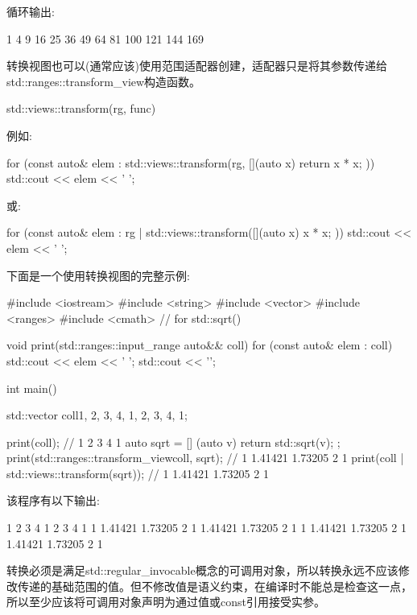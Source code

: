 循环输出:

\begin{shell}
1 4 9 16 25 36 49 64 81 100 121 144 169
\end{shell}


转换视图也可以(通常应该)使用范围适配器创建，适配器只是将其参数传递给std::ranges::transform\_view构造函数。

\begin{cpp}
std::views::transform(rg, func)
\end{cpp}

例如:

\begin{cpp}
for (const auto& elem : std::views::transform(rg, [](auto x) {
						return x * x;
					})) {
	std::cout << elem << ' ';
}
\end{cpp}

或:

\begin{cpp}
for (const auto& elem : rg | std::views::transform([](auto x) {
						x * x;
					})) {
	std::cout << elem << ' ';
}
\end{cpp}

下面是一个使用转换视图的完整示例:


\begin{cpp}
#include <iostream>
#include <string>
#include <vector>
#include <ranges>
#include <cmath> // for std::sqrt()

void print(std::ranges::input_range auto&& coll)
{
	for (const auto& elem : coll) {
		std::cout << elem << ' ';
	}
	std::cout << '\n';
}

int main()
{
	std::vector coll{1, 2, 3, 4, 1, 2, 3, 4, 1};
	
	print(coll); // 1 2 3 4 1
	auto sqrt = [] (auto v) { return std::sqrt(v); };
	print(std::ranges::transform_view{coll, sqrt}); // 1 1.41421 1.73205 2 1
	print(coll | std::views::transform(sqrt)); // 1 1.41421 1.73205 2 1
}
\end{cpp}

该程序有以下输出:

\begin{shell}
1 2 3 4 1 2 3 4 1
1 1.41421 1.73205 2 1 1.41421 1.73205 2 1
1 1.41421 1.73205 2 1 1.41421 1.73205 2 1
\end{shell}

转换必须是满足std::regular\_invocable概念的可调用对象，所以转换永远不应该修改传递的基础范围的值。但不修改值是语义约束，在编译时不能总是检查这一点，所以至少应该将可调用对象声明为通过值或const引用接受实参。

